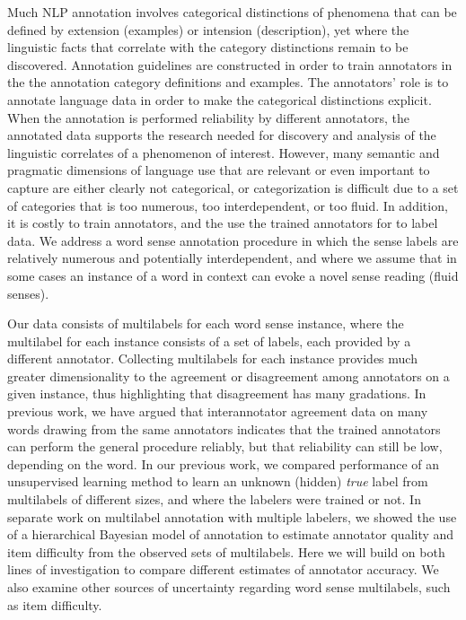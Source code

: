 \documentclass[11pt]{article}
\begin{document}
Much NLP annotation involves categorical distinctions of phenomena
that can be defined by extension (examples) or intension
(description), yet where the linguistic facts that correlate with the
category distinctions remain to be discovered. Annotation guidelines
are constructed in order to train annotators in the the annotation
category definitions and examples. The annotators’ role is to annotate
language data in order to make the categorical distinctions
explicit. When the annotation is performed reliability by different
annotators, the annotated data supports the research needed for
discovery and analysis of the linguistic correlates of a phenomenon
of interest. However, many semantic and pragmatic dimensions of
language use that are relevant or even important to capture are either
clearly not categorical, or categorization is difficult due to a set
of categories that is too numerous, too interdependent, or too
fluid. In addition, it is costly to train annotators, and the use the
trained annotators for to label data. We address a word sense
annotation procedure in which the sense labels are relatively numerous
and potentially interdependent, and where we assume that in some cases
an instance of a word in context can evoke a novel sense reading
(fluid senses).

Our data consists of multilabels for each word sense instance, where
the multilabel for each instance consists of a set of labels, each
provided by a different annotator. Collecting multilabels for each
instance provides much greater dimensionality to the agreement or
disagreement among annotators on a given instance, thus highlighting
that disagreement has many gradations. In previous work, we have
argued that interannotator agreement data on many words drawing from
the same annotators indicates that the trained annotators can perform
the general procedure reliably, but that reliability can still be low,
depending on the word. In our previous work, we compared performance
of an unsupervised learning method to learn an unknown (hidden) {\it
true} label from multilabels of different sizes, and where the
labelers were trained or not. In separate work on multilabel
annotation with multiple labelers, we showed the use of a hierarchical
Bayesian model of annotation to estimate annotator quality and item
difficulty from the observed sets of multilabels. Here we will build
on both lines of investigation to compare different estimates of
annotator accuracy. We also examine other sources of uncertainty
regarding word sense multilabels, such as item difficulty.
\end{document}
